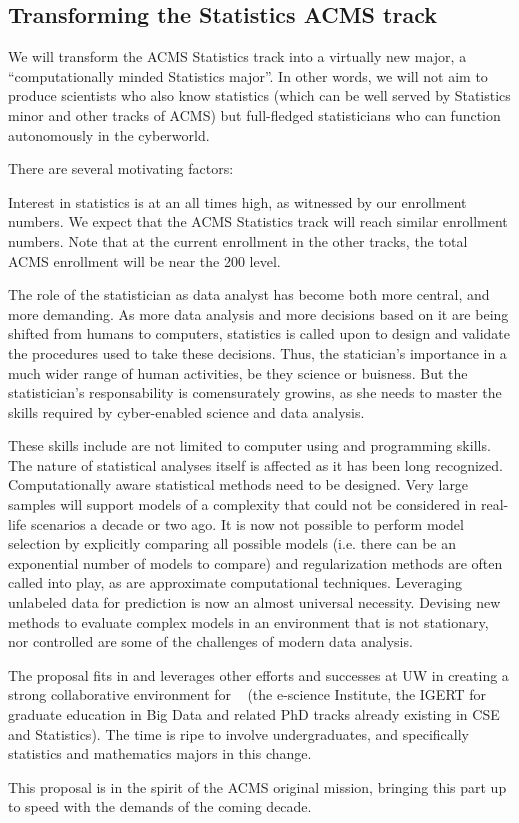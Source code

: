 \subsection{Transforming the Statistics  ACMS track}
We will transform the ACMS Statistics track into a virtually new
major, a ``computationally minded Statistics major''. In other words,
we will not aim to produce scientists who also know statistics (which
can be well served by Statistics minor and other tracks of ACMS) but
full-fledged statisticians who can function autonomously in the
cyberworld.

There are several motivating factors:
\bit
\item Interest in statistics is at an all times high, as witnessed by
  our enrollment numbers. We expect that the ACMS Statistics track
  will reach similar enrollment numbers. Note that at the current
  enrollment in the other tracks, the total ACMS enrollment will be
  near the 200 level.

\item {} The role of
  the statistician as data analyst has become both more central, and
  more demanding. As more data analysis and more decisions based on it
  are being shifted from humans to computers, statistics is called
  upon to design and validate the procedures used to take these
  decisions. Thus, the statician's importance in a much wider range of
  human activities, be they science or buisness. But the
  statistician's responsability is comensurately growins, as she needs
  to master the skills required by cyber-enabled science and data
  analysis.
\item These skills include are not limited to computer using and
  programming skills. The nature of statistical analyses itself is
  affected  as it has been long
  recognized. Computationally aware statistical methods need to be
  designed. Very large samples will support models of a complexity
  that could not be considered in real-life scenarios a decade or two
  ago. It is now not possible to perform model selection by explicitly
  comparing all possible models (i.e. there can be an exponential
  number of models to compare) and regularization methods are often
  called into play, as are approximate computational
  techniques. Leveraging unlabeled data for prediction is now an
  almost universal necessity. Devising new methods to evaluate complex
  models in an environment that is not stationary, nor controlled are
  some of the challenges of modern data analysis.
\item The proposal fits in and leverages other efforts and successes at UW in creating a strong collaborative environment for \cdse~ (the e-science Institute, the IGERT for graduate education in Big Data and related PhD tracks already existing in CSE and Statistics). The time is ripe to involve undergraduates, and specifically statistics and mathematics majors in this change.
\item This proposal is in the spirit of the ACMS original mission,
  bringing this part up to speed with the demands of the coming decade.
\eit


